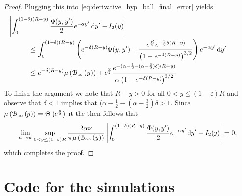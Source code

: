 \begin{appendices}
\begin{proof}
Plugging this into~\eqref{eq:derivative_hyp_ball_final_error} yields
\begin{align*}
	&\hspace{-30pt}\left|\int_0^{(1-\delta)(R- y)} \frac{\Phi(y,y^\prime)}{2} e^{-\alpha y^\prime} \dd y^\prime 
			- I_2(y)\right|\\
	&\le \int_0^{(1-\delta)(R- y)} \left(e^{-\delta(R-y)} \Phi(y,y^\prime) + 
		\frac{e^{\frac{R}{2}}e^{-\frac{3}{2}\delta(R-y)}}{\left(1 - e^{-\delta(R-y)}\right)^{3/2}}\right)
		e^{-\alpha y^\prime} \dd y^\prime \\
	&\le e^{-\delta(R-y)} \Mu{\BallPo{y}} + e^{\frac{y}{2}} \frac{e^{-(\alpha - \frac{1}{2} - (\alpha - \frac{3}{2})\delta)(R-y)}}
		{\alpha \left(1 - e^{-\delta(R-y)}\right)^{3/2}}
\end{align*}
To finish the argument we note that $R-y > 0$ for all $0 < y \le (1-\varepsilon)R$ and observe that $\delta < 1$ implies that $(\alpha - \frac{1}{2} - (\alpha - \frac{3}{2})\delta > 1$. Since $\mu\left({\mathcal B}_{\infty}\left(y\right)\right) = \Theta\left(e^{\frac{y}{2}}\right)$ it the
then follows that
\[
	\lim_{n \to \infty} \sup_{0 < y \le (1-\varepsilon)R} \frac{2\alpha \nu}{\pi \mu\left({\mathcal B}_{\infty}\left(y\right)\right)}
	\left|\int_0^{(1-\delta)(R- y)} \frac{\Phi(y,y^\prime)}{2} e^{-\alpha y^\prime} \operatorname{\mathrm{d}\hspace{-2pt}} y^\prime - I_2(y)\right| = 0,
\]
which completes the proof.
\end{proof}

\section{Code for the simulations}


\end{appendices}
